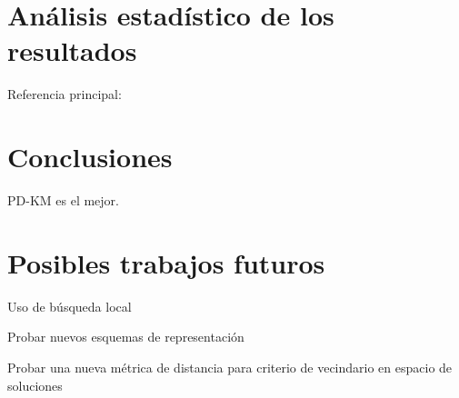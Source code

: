 \section{Análisis estadístico de los resultados}

Referencia principal: \cite{benavoli2017time}

\section{Conclusiones}

PD-KM es el mejor.

\section{Posibles trabajos futuros}

Uso de búsqueda local

Probar nuevos esquemas de representación

Probar una nueva métrica de distancia para criterio de vecindario en espacio de soluciones
